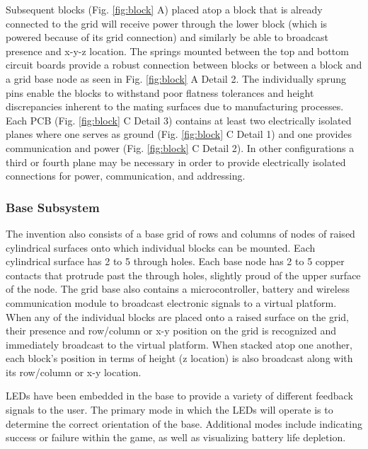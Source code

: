 \documentclass[]{article}
\begin{document}
Subsequent blocks (Fig. \ref{fig:block} A) placed atop a block that is already connected to the grid will receive power through the lower block (which is powered because of its grid connection) and similarly be able to broadcast presence and x-y-z location. The springs mounted between the top and bottom circuit boards provide a robust connection between blocks or between a block and a grid base node as seen in Fig. \ref{fig:block} A Detail 2.  The individually sprung pins  enable the blocks to withstand poor flatness tolerances and height discrepancies inherent to the mating surfaces due to manufacturing processes. Each PCB (Fig. \ref{fig:block} C Detail 3) contains at least two electrically isolated planes where one serves as ground (Fig. \ref{fig:block} C Detail 1) and one provides communication and power (Fig. \ref{fig:block} C Detail 2). In other configurations a third or fourth plane may be necessary in order to provide electrically isolated connections for power, communication, and addressing. 


\subsubsection{Base Subsystem}
The invention also consists of a base grid of rows and columns of nodes of raised cylindrical surfaces onto which individual blocks can be mounted. Each cylindrical surface has 2 to 5 through holes. Each base node has 2 to 5 copper contacts that protrude past the through holes, slightly proud of  the upper surface of the node. The grid base also contains a microcontroller, battery and wireless communication module to broadcast electronic signals to a virtual platform. When any of the individual blocks are placed onto a raised surface on the grid, their presence and row/column or x-y position on the grid is recognized and immediately broadcast to the virtual platform. When stacked atop one another, each block’s position in terms of height (z location) is also broadcast along with its row/column or x-y location.

LEDs have been embedded in the base to provide a variety of different feedback signals to the user.  The primary mode in which the LEDs will operate is to determine the correct orientation of the base.  Additional modes include indicating success or failure within the game, as well as visualizing battery life depletion.
\end{document}
